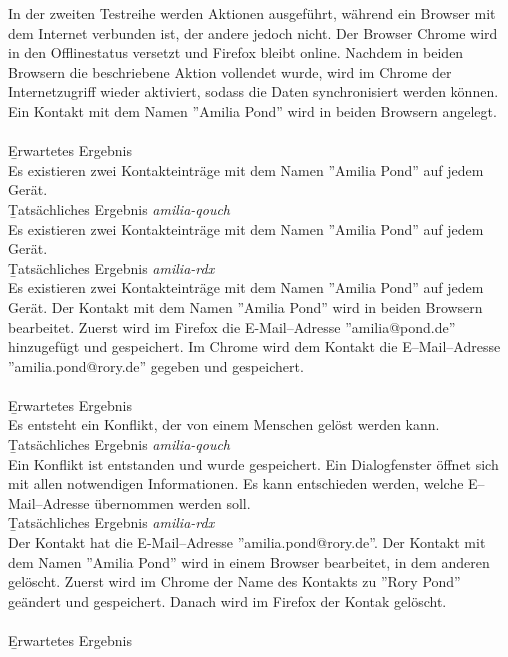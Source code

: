 In der zweiten Testreihe werden Aktionen ausgeführt, während ein Browser mit dem Internet verbunden ist, der andere jedoch nicht.
Der Browser Chrome wird in den Offlinestatus versetzt und Firefox bleibt online.
Nachdem in beiden Browsern die beschriebene Aktion vollendet wurde, wird im Chrome der Internetzugriff wieder aktiviert, sodass die Daten synchronisiert werden können. 
% 
Ein Kontakt mit dem Namen ''Amilia Pond'' wird in beiden Browsern angelegt.\\\\
\b{Erwartetes Ergebnis}\\
Es existieren zwei Kontakteinträge mit dem Namen ''Amilia Pond'' auf jedem Gerät.\\
\b{Tatsächliches Ergebnis \it{amilia-qouch}}\\
Es existieren zwei Kontakteinträge mit dem Namen ''Amilia Pond'' auf jedem Gerät.\\
\b{Tatsächliches Ergebnis \it{amilia-rdx}}\\
Es existieren zwei Kontakteinträge mit dem Namen ''Amilia Pond'' auf jedem Gerät.
%
Der Kontakt mit dem Namen ''Amilia Pond'' wird in beiden Browsern bearbeitet.
Zuerst wird im Firefox die E-Mail--Adresse ''amilia@pond.de'' hinzugefügt und gespeichert.
Im Chrome wird dem Kontakt die E--Mail--Adresse ''amilia.pond@rory.de'' gegeben und gespeichert.\\\\
\b{Erwartetes Ergebnis}\\
Es entsteht ein Konflikt, der von einem Menschen gelöst werden kann.\\
\b{Tatsächliches Ergebnis \it{amilia-qouch}}\\
Ein Konflikt ist entstanden und wurde gespeichert. Ein Dialogfenster öffnet sich mit allen notwendigen Informationen.
Es kann entschieden werden, welche E--Mail--Adresse übernommen werden soll.\\
\b{Tatsächliches Ergebnis \it{amilia-rdx}}\\
Der Kontakt hat die E-Mail--Adresse ''amilia.pond@rory.de''.
%
%
Der Kontakt mit dem Namen ''Amilia Pond'' wird in einem Browser bearbeitet, in dem anderen gelöscht.
Zuerst wird im Chrome der Name des Kontakts zu ''Rory Pond'' geändert und gespeichert.
Danach wird im Firefox der Kontak gelöscht.\\\\
\b{Erwartetes Ergebnis}\\
